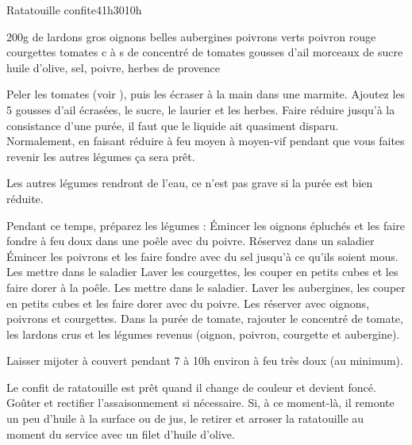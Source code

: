 \begin{recette}{Ratatouille confite}{4}{1h30}{10h}
\begin{ingredients}
\ingredient 200g de lardons
 gros oignons
 belles aubergines
 poivrons verts
 poivron rouge
 courgettes
 tomates
 c à s de concentré de tomates
 gousses d'ail
 morceaux de sucre
\ingredient huile d'olive, sel, poivre, herbes de provence
\end{ingredients}

\begin{preparation}
\etape Peler les tomates (voir ), puis les écraser à la main dans une marmite. Ajoutez les 5 gousses d'ail écrasées, le sucre, le laurier et les herbes. 
\etape Faire réduire jusqu'à la consistance d'une purée, il faut que le liquide ait quasiment disparu. Normalement, en faisant réduire à feu moyen à moyen-vif pendant que vous faites revenir les autres légumes ça sera prêt. 
\begin{remarque}
Les autres légumes rendront de l'eau, ce n'est pas grave si la purée est bien réduite.
\end{remarque}
\etape Pendant ce temps, préparez les légumes : 
\etape Émincer les oignons épluchés et les faire fondre à feu doux dans une poêle avec du poivre. Réservez dans un saladier
\etape Émincer les poivrons et les faire fondre avec du sel jusqu'à ce qu'ils soient mous. Les mettre dans le saladier
\etape Laver les courgettes, les couper en petits cubes et les faire dorer à la poêle. Les mettre dans le saladier.
\etape Laver les aubergines, les couper en petits cubes et les faire dorer avec du poivre. Les réserver avec oignons, poivrons et courgettes.
\etape Dans la purée de tomate, rajouter le concentré de tomate, les lardons crus et les légumes revenus (oignon, poivron, courgette et aubergine).
\end{preparation}

\begin{cuisson}
Laisser mijoter à couvert pendant 7 à 10h environ à feu très doux (au minimum). 

Le confit de ratatouille est prêt quand il change de couleur et devient foncé. Goûter et rectifier l'assaisonnement si nécessaire. Si, à ce moment-là, il remonte un peu d'huile à la surface ou de jus, le retirer et arroser la ratatouille au moment du service avec un filet d'huile d'olive.

\end{cuisson}
\end{recette}

